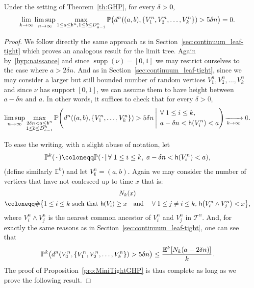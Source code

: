 \documentclass[AHL,Unicode,published]{cedram}
\newcommand{\proba}[1]{\mathbb{P}\left(#1\right)}
\newcommand{\probak}[1]{\mathbb{P}^k\left(#1\right)}
\DeclareMathOperator*{\supp}{supp}
\renewcommand{\P}{{\mathbb{P}}}
\newcommand{\E}{\mathbb{E}}
\newcommand{\1}{\mathbbm{1}}
\newcommand{\T}{\mathcal{T}}
\newcommand{\h}{\mathsf{h}}
\let\originalleft\left
\let\originalright\right
\renewcommand{\left}{\mathopen{}\mathclose\bgroup\originalleft}
\renewcommand{\right}{\aftergroup\egroup\originalright}
\renewcommand*{\to}{\mathchoice{\longrightarrow}{\rightarrow}{\rightarrow}{\rightarrow}}
\let\oldforall\forall
\renewcommand*{\forall}{\mathrel{\oldforall}}
\begin{document}
\begin{prop} \label{pro:MiniTightGHP}
Under the setting of Theorem~\ref{th:GHP}, for every $\delta>0$,
\[
\lim_{k\to \infty} \limsup_{n\to \infty} \max_{1\leq a\leq \h^n,1\leq b\leq D^n_{a-1}} \mathbb{P}\bigl(
d^n((a,b),\{V^n_1,V^n_2,\dots,V^n_k\})>{5}\delta n\bigr) = 0.
\]
\end{prop}
\begin{proof}
We follow directly the same approach as in Section~\ref{sec:continuum_leaf-tight} which proves an analogous result for the limit tree. Again by~\ref{hyp:naissance} and since $\supp(\nu)=[0,1]$ we may restrict {ourselves} to the case where $a>2\delta n$. And as in Section~\ref{sec:continuum_leaf-tight}, since we may consider a larger but still bounded number of random vertices $V_1^n, V_2^n,\dots, V_k^n$ and since $\nu$ has support $[0,1]$, we can assume them to have height between $a-\delta n$ and $a$. In other words, it suffices to check that for every $\delta>0$,
\begin{align*}
\limsup_{n\to \infty} \max_{\substack{2\delta n< a\leq \h^n\\1\leq b\leq D^n_{a-1}}} \proba{d^n((a,b),\{V^n_1,\dots,V^n_k\})> {5}\delta n\,\middle|\,
\begin{aligned} 
&\forall 1\leq i \leq k,\\
&\;a-\delta n<\h(V^n_i)<a
\end{aligned}
}\!
\xrightarrow[k\to \infty]{} 0.
\end{align*}

To ease the writing, with a slight abuse of notation, let
\[
\probak{\,\cdot\,}\coloneqq\proba{\,\cdot\, \middle |\, \forall 1\leq i \leq k,\; a-\delta n<\h(V^n_i)<a},
\]
(define similarly $\E^k$) and let $V_0^n=(a,b)$. Again we may consider the number of vertices that have not coalesced up to time $x$ that is:
\begin{multline*}
N_k(x)\\
\coloneqq\#\left\{1\leq i \leq k \text{ such that } \h(V_i)\geq x\quad\text{and}\quad \forall 1\leq j \neq i \leq k, \, \h\left(V^n_i\wedge V^n_j\right)<x\right\},
\end{multline*}
where $V^n_i \wedge V^n_j$ is the nearest common ancestor of $V^n_i$ and $V^n_j$ in $\T^n$. And, for exactly the same reasons as in Section~\ref{sec:continuum_leaf-tight}, one can see that
\[
\P^k\bigl(d^n\left(V^n_0, \left\{V^n_1, V^n_2, \dots, V^n_k\right\}\right) > {5}\delta n\bigr) \le \frac{\E^k\left[N_k(a-2\delta n)\right]}{k}.
\]
The proof of Proposition~\ref{pro:MiniTightGHP} is thus complete as long as we prove the following result.
\end{proof}
\end{document}
